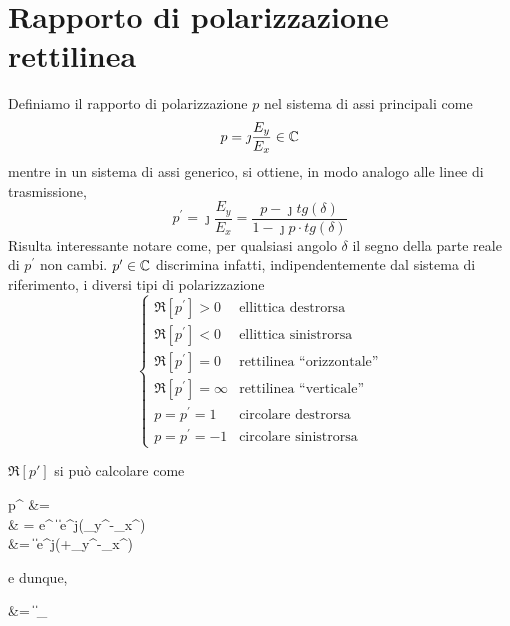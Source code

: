 \section{Rapporto di polarizzazione rettilinea}
Definiamo il rapporto di polarizzazione $p$ nel sistema di assi principali come
\begin{equation}
	p = \jmath \frac{E_y}{E_x} \in \mathbb{C}
\end{equation}
mentre in un sistema di assi generico, si ottiene, in modo analogo alle linee di trasmissione,
\begin{equation}
	p^\prime = \jmath \frac{E_y}{E_x} = \frac{p - \jmath tg(\delta)}{1-\jmath p \cdot tg(\delta)}
\end{equation}
Risulta interessante notare come, per qualsiasi angolo $\delta$ il segno della parte reale di $p^\prime$ non cambi. $p^\prime \in \mathbb{C}$ discrimina infatti, indipendentemente dal sistema di riferimento, i diversi tipi di polarizzazione
\begin{equation}\begin{cases}
	\Re[p^\prime] >0 & \text{ellittica destrorsa} \\
	\Re[p^\prime] <0 & \text{ellittica sinistrorsa} \\
	\Re[p^\prime] =0 & \text{rettilinea ``orizzontale''} \\
	\Re[p^\prime] =\infty & \text{rettilinea ``verticale''} \\
	p = p^\prime = 1 & \text{circolare destrorsa} \\
	p = p^\prime = -1 & \text{circolare sinistrorsa}
\end{cases}\end{equation}


$\Re [p\prime]$ si può calcolare come
\begin{esp*}
	p^\prime
	&= \jmath {} \\
	& = e^{\jmath {}} \cdot \left \|  \right \|
	\cdot e^{j(\Phi_{y^{\prime}}-\Phi_{x^{\prime}})} \\
	&= \left \|  \right \| \cdot e^{j(+\Phi_{y^{\prime}}-\Phi_{x^{\prime}})}
\end{esp*}

e dunque,
\begin{esp*}
	\Re[p^\prime]
	&= \left \|  \right \| \cdot {}_{}
\end{esp*}

